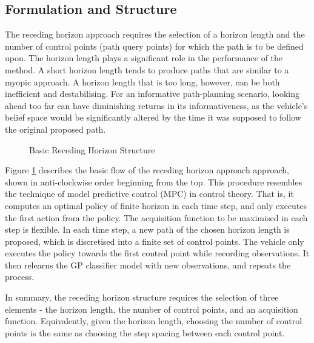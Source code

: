 		\subsection{Formulation and Structure}
	
			The receding horizon approach requires the selection of a horizon length and the number of control points (path query points) for which the path is to be defined upon. The horizon length plays a significant role in the performance of the method. A short horizon length tends to produce paths that are similar to a myopic approach. A horizon length that is too long, however, can be both inefficient and destabilising. For an informative path-planning scenario, looking ahead too far can have diminishing returns in its informativeness, as the vehicle's belief space would be significantly altered by the time it was supposed to follow the original proposed path.
	
			\begin{figure}[!htbp]
				\begin{center}
				\end{center}
			\caption{Basic Receding Horizon Structure}
			\label{Figure:RecedingHorizonMethodOutline}
			\end{figure}
					
			Figure \ref{Figure:RecedingHorizonMethodOutline} describes the basic flow of the receding horizon approach approach, shown in anti-clockwise order beginning from the top. This procedure resembles the technique of model predictive control (MPC) in control theory. That is, it computes an optimal policy of finite horizon in each time step, and only executes the first action from the policy. The acquisition function to be maximised in each step is flexible. In each time step, a new path of the chosen horizon length is proposed, which is discretised into a finite set of control points. The vehicle only executes the policy towards the first control point while recording observations. It then relearns the GP classifier model with new observations, and repeats the process.
	
			In summary, the receding horizon structure requires the selection of three elements - the horizon length, the number of control points, and an acquisition function. Equivalently, given the horizon length, choosing the number of control points is the same as choosing the step spacing between each control point.
				
